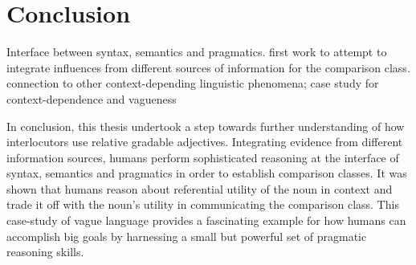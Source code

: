 
\section{Conclusion}
Interface between syntax, semantics and pragmatics. first work to attempt to integrate influences from different sources of information for the comparison class. connection to other context-depending linguistic phenomena; case study for context-dependence and vagueness

In conclusion, this thesis undertook a step towards further understanding of how interlocutors use relative gradable adjectives. Integrating evidence from different information sources, humans perform sophisticated reasoning at the interface of syntax, semantics and pragmatics in order to establish comparison classes. It was shown that humans reason about referential utility of the noun in context and trade it off with the noun's utility in communicating the comparison class. This case-study of vague language provides a fascinating example for how humans can accomplish big goals by harnessing a small but powerful set of pragmatic reasoning skills. 
